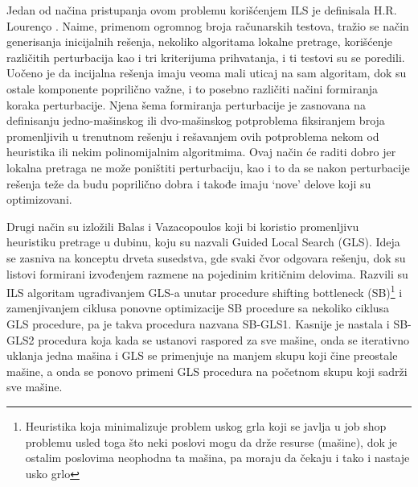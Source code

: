 \documentclass[a4paper]{article}
\begin{document}
Jedan od načina pristupanja ovom problemu korišćenjem ILS je definisala H.R. Lourenço \cite{jobShopScheduling}. Naime, primenom ogromnog broja računarskih testova, tražio se način generisanja inicijalnih rešenja, nekoliko algoritama lokalne pretrage, korišćenje različitih perturbacija kao i tri kriterijuma prihvatanja, i ti testovi su se poredili. Uočeno je da incijalna rešenja imaju veoma mali uticaj na sam algoritam, dok su ostale komponente poprilično važne, i to posebno različiti načini formiranja koraka perturbacije. Njena šema formiranja perturbacije je zasnovana na definisanju jedno-mašinskog ili dvo-mašinskog potproblema fiksiranjem broja promenljivih u trenutnom rešenju i rešavanjem ovih potproblema nekom od heuristika ili nekim polinomijalnim algoritmima. Ovaj način će raditi dobro jer lokalna pretraga ne može poništiti perturbaciju, kao i to da se nakon perturbacije rešenja teže da budu poprilično dobra i takođe imaju \enquote*{nove} delove koji su optimizovani.

Drugi način su izložili Balas i Vazacopoulos koji bi koristio promenljivu heuristiku pretrage u dubinu, koju su nazvali Guided Local Search (GLS). Ideja se zasniva na konceptu drveta susedstva, gde svaki čvor odgovara rešenju, dok su listovi formirani izvođenjem razmene na pojedinim kritičnim delovima. Razvili su ILS algoritam ugrađivanjem GLS-a unutar procedure shifting bottleneck (SB)\footnote{Heuristika koja minimalizuje problem uskog grla koji se javlja u job shop problemu usled toga što neki poslovi mogu da drže resurse (mašine), dok je ostalim poslovima neophodna ta mašina, pa moraju da čekaju i tako i nastaje usko grlo} i zamenjivanjem ciklusa ponovne optimizacije SB procedure sa nekoliko ciklusa GLS procedure, pa je takva procedura nazvana SB-GLS1. Kasnije je nastala i SB-GLS2 procedura koja kada se ustanovi raspored za sve mašine, onda se iterativno uklanja jedna mašina i GLS se primenjuje na manjem skupu koji čine preostale mašine, a onda se ponovo primeni GLS procedura na početnom skupu koji sadrži sve mašine.

\end{document}
